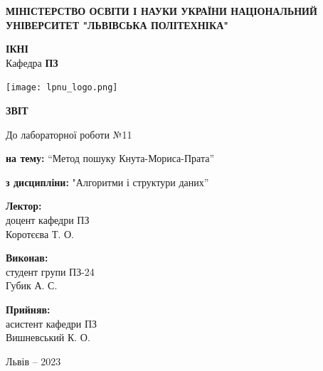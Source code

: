 \documentclass[12pt]{extarticle}
\begin{document}
\begin{titlepage}
    \begin{center}
        \textbf{\normalsize{\MakeUppercase{
            Міністерство Освіти і науки України
            Національний університет "Львівська політехніка"
        }}}

        \begin{flushright}
        \textbf{ІКНІ}\\
        Кафедра \textbf{ПЗ}
        \end{flushright}
        \vspace{15mm}

        \texttt{[image: lpnu\_logo.png]}

        \vspace*{\fill}

        \textbf{\normalsize{\MakeUppercase{Звіт}}}
            
        До лабораторної роботи №11

        \textbf{на тему:} “Метод пошуку Кнута-Мориса-Прата”

        \textbf{з дисципліни:} "Алгоритми і структури даних”
            
        \vspace*{\fill}

        \begin{flushright}

            \textbf{Лектор:}\\
            доцент кафедри ПЗ\\
            Коротєєва Т. О.\\
            \vspace{12pt}

            \textbf{Виконав:}\\
            студент групи ПЗ-24\\
            Губик А. С.\\
            \vspace{12pt}

            \textbf{Прийняв:}\\
            асистент кафедри ПЗ\\
            Вишневський К. О.\\
        \vspace{12pt}
        \end{flushright}

        Львів -- 2023
            
            
    \end{center}
\end{titlepage}
\end{document}
